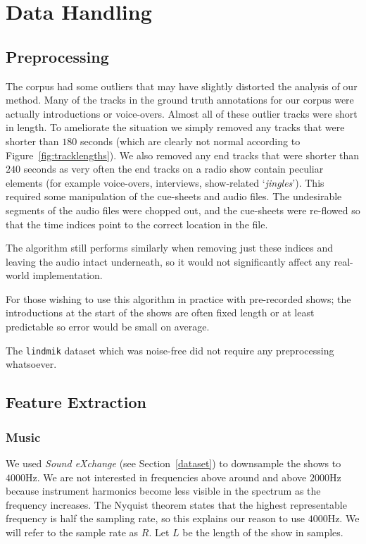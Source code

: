 \documentclass[twocolumn]{article}
\begin{document}
	\section{Data Handling}\label{sec:data-handling}
	
	\subsection{Preprocessing}\label{proprocessing} %
	
	The corpus had some outliers that may have slightly distorted the analysis of our method. Many of the tracks in the ground truth annotations for our corpus were actually introductions or voice-overs. Almost all of these outlier tracks were short in length. To ameliorate the situation we simply removed any tracks that were shorter than $180$ seconds (which are clearly not normal according to Figure~\ref{fig:tracklengths}). We also removed any end tracks that were shorter than $240$ seconds as very often the end tracks on a radio show contain peculiar elements (for example voice-overs, interviews, show-related `\textit{jingles}'). This required some manipulation of the cue-sheets and audio files. The undesirable segments of the audio files were chopped out, and the cue-sheets were re-flowed so that the time indices point to the correct location in the file. 
	
	The algorithm still performs similarly when removing just these indices and leaving the audio intact underneath, so it would not significantly affect any real-world implementation. 
	
	For those wishing to use this algorithm in practice with pre-recorded shows; the introductions at the start of the shows are often fixed length or at least predictable so error would be small on average.
	
	The \texttt{lindmik} dataset which was noise-free did not require any preprocessing whatsoever. 
	
	\subsection{Feature Extraction}\label{sec:feature-extraction}
	
	\subsubsection{Music}\label{feat_ex} %
	
	We used \textit{Sound eXchange} (see Section~\ref{dataset}) to downsample the shows to $4000$Hz. We are not interested in frequencies above around and above $2000$Hz because instrument harmonics become less visible in the spectrum as the frequency increases. The Nyquist theorem \cite{nyquist1928certain} states that the highest representable frequency is half the sampling rate, so this explains our reason to use $4000$Hz. We will refer to the sample rate as $R$. Let $L$ be the length of the show in samples.
	
\end{document}
